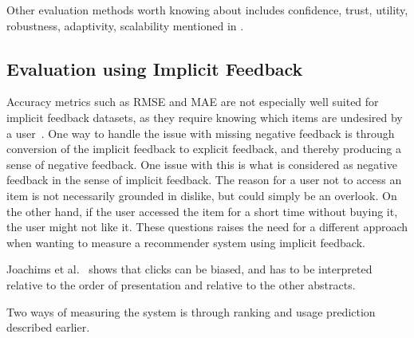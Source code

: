 Other evaluation methods worth knowing about includes confidence, trust, utility, robustness, adaptivity, scalability mentioned in \cite{Herlocker2004, Shani2011}.

\subsection{Evaluation using Implicit Feedback}
Accuracy metrics such as RMSE and MAE are not especially well suited for implicit feedback datasets, as they require knowing which items are undesired by a user~\cite{Hu2008}.
One way to handle the issue with missing negative feedback is through conversion of the implicit feedback to explicit feedback, and thereby producing a sense of negative feedback.
One issue with this is what is considered as negative feedback in the sense of implicit feedback.
The reason for a user not to access an item is not necessarily grounded in dislike, but could simply be an overlook.
On the other hand, if the user accessed the item for a short time without buying it, the user might not like it.
These questions raises the need for a different approach when wanting to measure a recommender system using implicit feedback.

Joachims et al.~\cite{Joachims07evaluatingthe} shows that clicks can be biased, and has to be interpreted relative to the order of presentation and relative to the other abstracts.


Two ways of measuring the system is through ranking and usage prediction described earlier.



